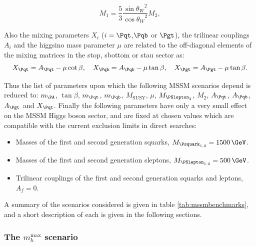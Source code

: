 \begin{equation}
M_{1} = \frac{5}{3}\frac{{\sin{\theta_{W}}}^{2}}{{\cos{\theta_{W}}}^{2}} M_{2},
\label{eq:GUTrelation}
\end{equation}

Also the mixing parameters $X_{i}$ ($i=\Pqt$,$\Pqb$ or
$\Pgt$), the trilinear couplings $A_{i}$ and the higgsino mass parameter $\mu$ 
are related to the off-diagonal elements of the mixing matrices in the
stop, sbottom or stau sector as:
\begin{equation}
X_{\Pqt} = A_{\Pqt} -\mu\cot\beta, \quad X_{\Pqb} = A_{\Pqb} -\mu\tan\beta,
\quad X_{\Pgt} = A_{\Pgt} -\mu\tan\beta .
\end{equation}

Thus the list of parameters upon which the following \ac{MSSM} scenarios depend is
reduced to: $m_{\PA}$, $\tan\beta$, $m_{\Pqt}$, $m_{\Pqb}$, $M_{\text{SUSY}}$,
$\mu$, $M_{\PSlepton_{3}}$, $M_{2}$, $A_{\Pqt}$, $A_{\Pqb}$, $A_{\Pgt}$ and
$X_{\Pqt}$. Finally the following parameters have only a very small effect on
the \ac{MSSM} Higgs boson sector, and are fixed at chosen values which are compatible
with the current exclusion limits in direct searches:

\begin{itemize}
\item Masses of the first and second generation squarks, $M_{\Psquark_{1,2}} =
1500\,\GeV$.
\item Masses of the first and second generation sleptons, $M_{\PSlepton_{1,2}}
= 500\,\GeV$.
\item Trilinear couplings of the first and second generation squarks and
leptons, $A_{f} = 0$.
\end{itemize}

A summary of the scenarios considered is given in table
\ref{tab:mssmbenchmarks}, and a short description of each is given in the
following sections.

\subsubsection{The $m_{h}^{\text{max}}$ scenario}
\label{sec:mhmaxscenario}

